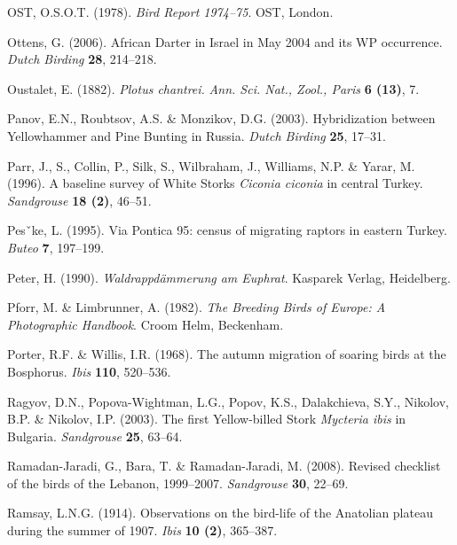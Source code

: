 \documentclass[
  a4paper,
  DIV=11,
  numbers=noendperiod]{scrreprt}
\newlength{\cslhangindent}
\newenvironment{CSLReferences}[2] %
 {\begin{list}{}{%
  \setlength{\itemindent}{0pt}
  \setlength{\leftmargin}{0pt}
  \setlength{\parsep}{0pt}
  \ifodd #1
   \setlength{\leftmargin}{\cslhangindent}
   \setlength{\itemindent}{-1\cslhangindent}
  \fi
  \setlength{\itemsep}{#2\baselineskip}}}
 {\end{list}}
\begin{document}
\begin{CSLReferences}{1}{1}
OST, O.S.O.T. (1978). \emph{{Bird Report 1974--75}}. OST, London.

Ottens, G. (2006). {African Darter in Israel in May 2004 and its WP
occurrence}. \emph{Dutch Birding} \textbf{28}, 214--218.

Oustalet, E. (1882). {\emph{Plotus chantrei.}} \emph{Ann. Sci. Nat.,
Zool., Paris} \textbf{6 (13)}, 7.

Panov, E.N., Roubtsov, A.S. \& Monzikov, D.G. (2003). {Hybridization
between Yellowhammer and Pine Bunting in Russia}. \emph{Dutch Birding}
\textbf{25}, 17--31.

Parr, J., S., Collin, P., Silk, S., Wilbraham, J., Williams, N.P. \&
Yarar, M. (1996). {A baseline survey of White Storks \emph{Ciconia
ciconia} in central Turkey}. \emph{Sandgrouse} \textbf{18 (2)}, 46--51.

Pesˇke, L. (1995). {Via Pontica 95: census of migrating raptors in
eastern Turkey}. \emph{Buteo} \textbf{7}, 197--199.

Peter, H. (1990). \emph{{Waldrappdämmerung am Euphrat}}. Kasparek
Verlag, Heidelberg.

Pforr, M. \& Limbrunner, A. (1982). \emph{{The Breeding Birds of Europe:
A Photographic Handbook}}. Croom Helm, Beckenham.

Porter, R.F. \& Willis, I.R. (1968). {The autumn migration of soaring
birds at the Bosphorus}. \emph{Ibis} \textbf{110}, 520--536.

Ragyov, D.N., Popova-Wightman, L.G., Popov, K.S., Dalakchieva, S.Y.,
Nikolov, B.P. \& Nikolov, I.P. (2003). {The first Yellow-billed Stork
\emph{Mycteria ibis} in Bulgaria}. \emph{Sandgrouse} \textbf{25},
63--64.

Ramadan-Jaradi, G., Bara, T. \& Ramadan-Jaradi, M. (2008). {Revised
checklist of the birds of the Lebanon, 1999--2007}. \emph{Sandgrouse}
\textbf{30}, 22--69.

Ramsay, L.N.G. (1914). {Observations on the bird-life of the Anatolian
plateau during the summer of 1907}. \emph{Ibis} \textbf{10 (2)},
365--387.


\end{CSLReferences}
\end{document}
